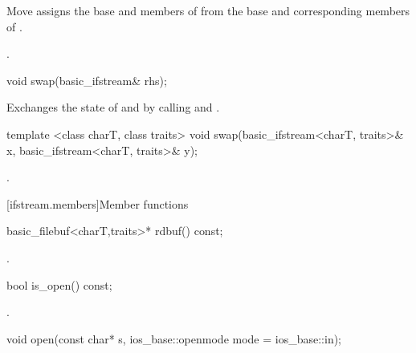 \begin{itemdescr}
\pnum
\effects Move assigns the base and members of  from the base and corresponding
members of .

\pnum
\returns {}.
\end{itemdescr}

%
%
\begin{itemdecl}
void swap(basic_ifstream& rhs);
\end{itemdecl}

\begin{itemdescr}
\pnum
\effects Exchanges the state of 
and  by calling
 and
.
\end{itemdescr}

%
%
\begin{itemdecl}
template <class charT, class traits>
void swap(basic_ifstream<charT, traits>& x,
          basic_ifstream<charT, traits>& y);
\end{itemdecl}

\begin{itemdescr}
\pnum
\effects {}.
\end{itemdescr}

[ifstream.members]{Member functions}

%
\begin{itemdecl}
basic_filebuf<charT,traits>* rdbuf() const;
\end{itemdecl}

\begin{itemdescr}
\pnum
\returns
{}.
\end{itemdescr}

%
\begin{itemdecl}
bool is_open() const;
\end{itemdecl}

\begin{itemdescr}
\pnum
\returns
{}.
\end{itemdescr}

%
\begin{itemdecl}
void open(const char* s, ios_base::openmode mode = ios_base::in);
\end{itemdecl}

